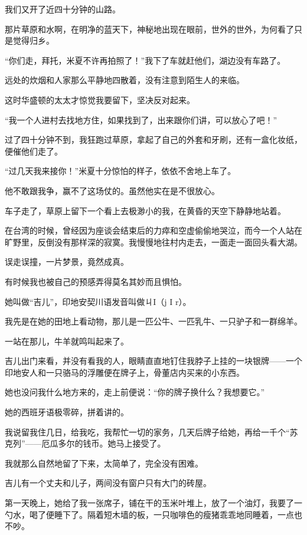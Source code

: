 \par 我们又开了近四十分钟的山路。
\par 那片草原和水啊，在明净的蓝天下，神秘地出现在眼前，世外的世外，为何看了只是觉得归乡。
\par “你们走，拜托，米夏不许再拍照了！”我下了车就赶他们，湖边没有车路了。
\par 远处的炊烟和人家那么平静地四散着，没有注意到陌生人的来临。
\par 这时华盛顿的太太才惊觉我要留下，坚决反对起来。
\par “我一个人进村去找地方住，如果找到了，出来跟你们讲，可以放心了吧！”
\par 过了四十分钟不到，我狂跑过草原，拿起了自己的外套和牙刷，还有一盒化妆纸，便催他们走了。
\par “过几天我来接你！”米夏十分惊怕的样子，依依不舍地上车了。
\par 他不敢跟我争，赢不了这场仗的。虽然他实在是不很放心。
\par 车子走了，草原上留下一个看上去极渺小的我，在黄昏的天空下静静地站着。
\par 在台湾的时候，曾经因为座谈会结束后的力瘁和空虚偷偷地哭泣，而今一个人站在旷野里，反倒没有那样深的寂寞。我慢慢地往村内走去，一面走一面回头看大湖。
\par 误走误撞，一片梦景，竟然成真。
\par 有时候我也被自己的预感弄得莫名其妙而且惧怕。
\par 她叫做“吉儿”，印地安契川语发音叫做ㄐI（j I r）。
\par 我先是在她的田地上看动物，那儿是一匹公牛、一匹乳牛、一只驴子和一群绵羊。
\par 一站在那儿，牛羊就鸣叫起来了。
\par 吉儿出门来看，并没有看我的人，眼睛直直地钉住我脖子上挂的一块银牌——一个印地安人和一只骆马的浮雕便在牌子上，骨董店内买来的小东西。
\par 她也没问我什么地方来的，走上前便说：“你的牌子换什么？我想要它。”
\par 她的西班牙语极零碎，拼着讲的。
\par 我说留我住几日，给我吃，我帮忙一切的家务，几天后牌子给她，再给一千个“苏克列”——厄瓜多尔的钱币。她马上接受了。
\par 我就那么自然地留了下来，太简单了，完全没有困难。
\par 吉儿有一个丈夫和儿子，两间没有窗户只有大门的砖屋。
\par 第一天晚上，她给了我一张席子，铺在干的玉米叶堆上，放了一个油灯，我要了一勺水，喝了便睡下了。隔着短木墙的板，一只咖啡色的瘦猪乖乖地同睡着，一点也不吵。
